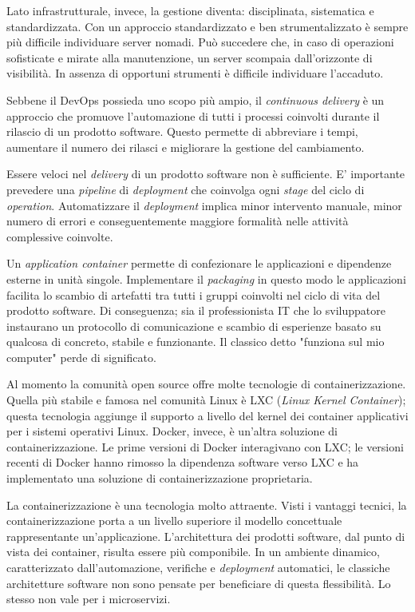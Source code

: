 Lato infrastrutturale, invece, la gestione diventa: disciplinata, sistematica e 
standardizzata. Con un approccio standardizzato e ben strumentalizzato è sempre 
più difficile individuare server nomadi. Può succedere che, in caso di 
operazioni sofisticate e mirate alla manutenzione, un server scompaia 
dall'orizzonte di visibilità. In assenza di opportuni strumenti è difficile 
individuare l'accaduto.   

Sebbene il DevOps possieda uno scopo più ampio, il \textit{continuous delivery} 
è un approccio che promuove l'automazione di tutti i processi coinvolti 
durante il rilascio di un prodotto software. Questo permette di abbreviare i 
tempi, aumentare il numero dei rilasci e migliorare la gestione del cambiamento.

Essere veloci nel \textit{delivery} di un prodotto software non è sufficiente. 
E' importante prevedere una \textit{pipeline} di \textit{deployment} che 
coinvolga ogni \textit{stage} del ciclo di \textit{operation}. Automatizzare il 
\textit{deployment} implica minor intervento manuale, minor numero di errori e 
conseguentemente maggiore formalità nelle attività complessive coinvolte. 

Un \textit{application container} permette di confezionare le applicazioni e 
dipendenze esterne in unità singole. Implementare il \textit{packaging} in 
questo modo le applicazioni facilita lo scambio di artefatti tra tutti i gruppi 
coinvolti nel ciclo di vita del prodotto software. Di conseguenza; sia il 
professionista IT che lo sviluppatore instaurano un protocollo di comunicazione 
e scambio di esperienze basato su qualcosa di concreto, stabile e funzionante.
Il classico detto "funziona sul mio computer" perde di significato.

Al momento la comunità open source offre molte tecnologie di 
containerizzazione. Quella più stabile e famosa nel comunità Linux è LXC 
(\textit{Linux Kernel Container}); questa tecnologia aggiunge il supporto a 
livello del kernel dei container applicativi per i sistemi operativi Linux. 
Docker, invece, è un'altra soluzione di containerizzazione. Le prime versioni 
di Docker interagivano con LXC; le versioni recenti di Docker hanno rimosso la 
dipendenza software verso LXC e ha implementato una soluzione di 
containerizzazione proprietaria. 

La containerizzazione è una tecnologia molto attraente. Visti i vantaggi 
tecnici, la containerizzazione porta a un livello superiore il modello 
concettuale rappresentante un'applicazione.  L'architettura dei prodotti 
software, dal punto di vista dei container, risulta essere più componibile. In 
un ambiente dinamico, caratterizzato dall'automazione, verifiche e 
\textit{deployment} automatici, le classiche architetture software non sono 
pensate per beneficiare di questa flessibilità. Lo stesso non vale per i  
microservizi. 

